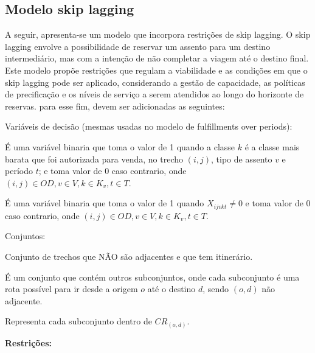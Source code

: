 \subsection{Modelo skip lagging}
A seguir, apresenta-se um modelo que incorpora restrições de skip lagging. O skip lagging envolve a possibilidade de reservar um assento para um destino intermediário, mas com a intenção de não completar a viagem até o destino final. Este modelo propõe restrições que regulam a viabilidade e as condições em que o skip lagging pode ser aplicado, considerando a gestão de capacidade, as políticas de precificação e os níveis de serviço a serem atendidos ao longo do horizonte de reservas. para esse fim, devem ser adicionadas as seguintes:

Variáveis de decisão (mesmas usadas no modelo de fulfillments over periods):
\begin{description}[style=unboxed, leftmargin=2.5cm, labelindent=1.5cm]
	\setlength{\itemsep}{-2.2em} %
	\setlength{\parskip}{0em} %
	\item[$\beta_{ijvkt}:$] É uma variável binaria que toma o valor de 1 quando a classe $k$ é a classe mais barata que foi autorizada para venda, no trecho $(i,j)$, tipo de assento $v$ e período $t$; e toma  valor de 0 caso contrario, onde $(i,j) \in OD, v \in V, k \in K_v, t \in T$.  \\
	\item[$\alpha_{ijvkt}:$] É uma variável binaria que toma o valor de 1 quando $X_{ijvkt} \neq 0$ e toma  valor de 0 caso contrario, onde $(i,j) \in OD, v \in V, k \in K_v, t \in T$.
\end{description}
Conjuntos:
\begin{description}[style=unboxed, leftmargin=2.5cm, labelindent=1.5cm]
	\setlength{\itemsep}{-2.2em} %
	\setlength{\parskip}{0em} %
	      \item[$NAD:$] Conjunto de trechos que NÃO são adjacentes e que tem itinerário.\\
	      \item[$CR_{(o,d)}:$] É um conjunto que contém outros subconjuntos, onde cada subconjunto é uma rota possível para ir desde a origem $o$ até o destino $d$, sendo $(o,d)$ não adjacente. \\
	      \item[$S:$] Representa cada subconjunto dentro de $CR_{(o,d)}$.
\end{description}
\textbf{Restrições:}\\
